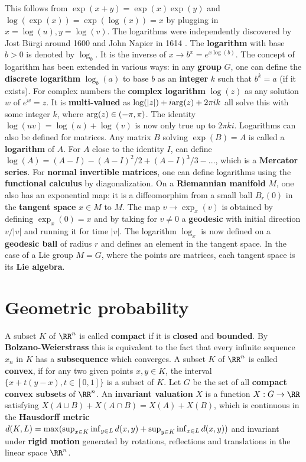 \documentclass[12pt]{amsart}
\begin{document}
This follows from $\exp(x+y) = \exp(x) \exp(y)$ and $\log(\exp(x))=\exp(\log(x))=x$ by
plugging in $x=\log(u), y = \log(v)$.
The logarithms were independently discovered by Jost B\"urgi around 1600 and John Napier in 1614
\cite{StaudacherBuergi}. The {\bf logarithm} with base $b>0$ is denoted by $\log_b$. It
is the inverse of $x \to b^x = e^{x \log(b)}$. The concept of logarithm has been extended
in various ways: in any {\bf group} $G$, one can define the {\bf discrete logarithm} $\log_b(a)$ to base $b$
as an {\bf integer} $k$ such that $b^k = a$ (if it exists). For complex numbers the {\bf complex logarithm}
$\log(z)$ as any solution $w$ of $e^w = z$. It is {\bf multi-valued}
as $\log(|z|) + i {\rm arg}(z) + 2\pi i k$ all solve this with some integer $k$,
where ${\rm arg}(z) \in (-\pi,\pi)$. The identity $\log(u v) = \log(u) + \log(v)$ is now only true
up to $2\pi k i$. Logarithms can also be defined for matrices. Any matrix $B$ solving $\exp(B)=A$ is called a {\bf logarithm}
of $A$. For $A$ close to the identity $I$, can define $\log(A) = (A-I) - (A-I)^2/2 + (A-I)^3/3 - ... $,
which is a {\bf Mercator series}. For {\bf normal invertible matrices}, one can define logarithms using
the {\bf functional calculus} by diagonalization.  On a {\bf Riemannian manifold} $M$, one also has an
exponential map: it is a diffeomorphim from a small ball $B_r(0)$ in the {\bf tangent space}
$x \in M$ to $M$. The map $v \to \exp_x(v)$ is obtained by defining $\exp_x(0)=x$ and by taking for
$v \neq 0$ a {\bf geodesic} with initial direction $v/|v|$ and running it for time $|v|$. The
logarithm $\log_x$ is now defined on a {\bf geodesic ball} of radius $r$ and defines an element in the
tangent space. In the case of a Lie group $M=G$, where the points are matrices, each tangent space is
its {\bf Lie algebra}.


\section{Geometric probability}

A subset $K$ of $\RR^n$ is called {\bf compact} if it is {\bf closed} and {\bf bounded}. By {\bf Bolzano-Weierstrass}
this is equivalent to the fact that every infinite sequence $x_n$ in $K$ has a {\bf subsequence} which converges. 
A subset $K$ of $\RR^n$ is called {\bf convex}, if for any two given points $x,y \in K$, the interval 
$\{ x+t(y-x), t \in [0,1]  \}$ is a subset of $K$. 
Let $G$ be the set of all {\bf compact convex subsets} of $\RR^n$. An {\bf invariant valuation}
$X$ is a function $X: G \to \RR$ satisfying $X(A \cup B) + X(A \cap B)= X(A)+X(B)$,
which is continuous in the {\bf Hausdorff metric} 
$d(K,L)= {\rm max}( \sup_{x \in K} \inf_{y \in L} d(x,y) + 
\sup_{y \in K} \inf_{x \in L} d(x,y))$ and invariant under {\bf rigid motion}
generated by rotations, reflections and translations in the linear space $\RR^n$. 
\end{document}
